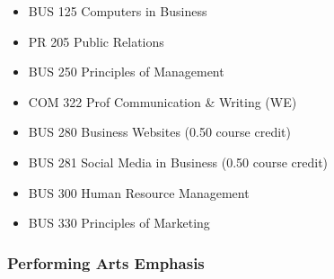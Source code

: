 \documentclass[
  letterpaper,
]{scrbook}
\providecommand{\tightlist}{%
  \setlength{\itemsep}{0pt}\setlength{\parskip}{0pt}}
\begin{document}
\begin{enumerate}
  \begin{itemize}
  \tightlist
  \item
    BUS 125 Computers in Business\\
  \item
    PR 205 Public Relations\\
  \item
    BUS 250 Principles of Management\\
  \item
    COM 322 Prof Communication \& Writing (WE)\\
  \item
    BUS 280 Business Websites (0.50 course credit)\\
  \item
    BUS 281 Social Media in Business (0.50 course credit)\\
  \item
    BUS 300 Human Resource Management\\
  \item
    BUS 330 Principles of Marketing
  \end{itemize}
\end{enumerate}

\subsubsection{Performing Arts Emphasis}\label{performing-arts-emphasis}
\end{document}
